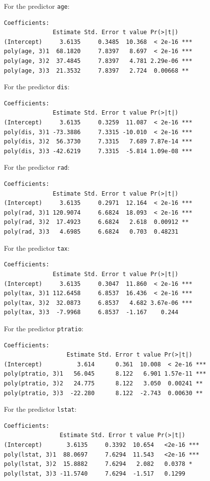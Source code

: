 \begin{itemize}
        For the predictor \verb|age|:
        \begin{lstlisting}
Coefficients:
              Estimate Std. Error t value Pr(>|t|)
(Intercept)     3.6135     0.3485  10.368  < 2e-16 ***
poly(age, 3)1  68.1820     7.8397   8.697  < 2e-16 ***
poly(age, 3)2  37.4845     7.8397   4.781 2.29e-06 ***
poly(age, 3)3  21.3532     7.8397   2.724  0.00668 **
        \end{lstlisting}

        For the predictor \verb|dis|:
        \begin{lstlisting}
Coefficients:
              Estimate Std. Error t value Pr(>|t|)
(Intercept)     3.6135     0.3259  11.087  < 2e-16 ***
poly(dis, 3)1 -73.3886     7.3315 -10.010  < 2e-16 ***
poly(dis, 3)2  56.3730     7.3315   7.689 7.87e-14 ***
poly(dis, 3)3 -42.6219     7.3315  -5.814 1.09e-08 ***
        \end{lstlisting}

        For the predictor \verb|rad|:
        \begin{lstlisting}
Coefficients:
              Estimate Std. Error t value Pr(>|t|)
(Intercept)     3.6135     0.2971  12.164  < 2e-16 ***
poly(rad, 3)1 120.9074     6.6824  18.093  < 2e-16 ***
poly(rad, 3)2  17.4923     6.6824   2.618  0.00912 **
poly(rad, 3)3   4.6985     6.6824   0.703  0.48231
        \end{lstlisting}

        For the predictor \verb|tax|:
        \begin{lstlisting}
Coefficients:
              Estimate Std. Error t value Pr(>|t|)
(Intercept)     3.6135     0.3047  11.860  < 2e-16 ***
poly(tax, 3)1 112.6458     6.8537  16.436  < 2e-16 ***
poly(tax, 3)2  32.0873     6.8537   4.682 3.67e-06 ***
poly(tax, 3)3  -7.9968     6.8537  -1.167    0.244
        \end{lstlisting}

        For the predictor \verb|ptratio|:
        \begin{lstlisting}
Coefficients:
                  Estimate Std. Error t value Pr(>|t|)
(Intercept)          3.614      0.361  10.008  < 2e-16 ***
poly(ptratio, 3)1   56.045      8.122   6.901 1.57e-11 ***
poly(ptratio, 3)2   24.775      8.122   3.050  0.00241 **
poly(ptratio, 3)3  -22.280      8.122  -2.743  0.00630 **
        \end{lstlisting}

        For the predictor \verb|lstat|:
        \begin{lstlisting}
Coefficients:
                Estimate Std. Error t value Pr(>|t|)
(Intercept)       3.6135     0.3392  10.654   <2e-16 ***
poly(lstat, 3)1  88.0697     7.6294  11.543   <2e-16 ***
poly(lstat, 3)2  15.8882     7.6294   2.082   0.0378 *
poly(lstat, 3)3 -11.5740     7.6294  -1.517   0.1299
        \end{lstlisting}


\end{itemize}
